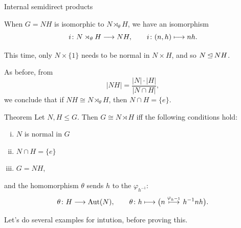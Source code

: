 \documentclass[8pt, handout]{beamer}
\newcommand{\Pause}{}      %
\begin{document}
\begin{frame}{Internal semidirect products}

  When $G=NH$ is isomorphic to $N\rtimes_\theta H$, we have an isomorphism
  \[
  i\colon N\rtimes_\theta H\longrightarrow NH,\qquad i\colon (n,h)\longmapsto nh.
  \]

  \Pause
  
  This time, only $N\times\{1\}$ needs to be normal in $N\times H$,
  and so $N\unlhd NH$. \medskip\Pause

  As before, from 
  \[
  \displaystyle|NH|=\frac{|N|\cdot|H|}{|N\cap H|},
  \]
  we conclude that if $NH\cong N\rtimes_\theta H$, then $N\cap H=\{e\}$.

  \Pause
  
  \begin{block}{Theorem}
    Let $N,H\leq G$. Then $G\cong N\rtimes H$ iff the following
    conditions hold:
    \begin{enumerate}[(i)]
    \item $N$ is normal in $G$
    \item $N\cap H=\{e\}$
    \item $G=NH$,
    \end{enumerate}
    and the homomorphism $\theta$ sends $h$ to the 
    $\varphi_{h^{-1}}$:
    \[
    \theta\colon H\longrightarrow\operatorname{Aut}(N),\qquad
    \theta\colon h\longmapsto
    \big(n\stackrel{\varphi_{h^{-1}}}{\longmapsto}h^{-1}nh
    \big).
    \]
  \end{block}

  \smallskip\Pause
  
  Let's do several examples for intution, before proving this. 
  
\end{frame}

\end{document}
